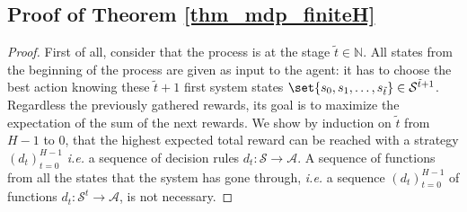 






\subsection{Proof of Theorem \ref{thm_mdp_finiteH}}
\label{thm_mdp_finiteH_RETURN}
\begin{proof}
First of all, consider that the process is at the stage $\tilde{t} \in \mathbb{N}$.
All states from the beginning of the process are given as input to the agent:
it has to choose the best action knowing these $\tilde{t}+1$ first system states 
$\set{ s_0, s_1, \ldots, s_{\tilde{t}} } \in \mathcal{S}^{\tilde{t}+1}$.
Regardless the previously gathered rewards, 
its goal is to maximize the expectation of the sum of the next rewards. 
We show by induction on $\tilde{t}$ from $H-1$ to $0$,
that the highest expected total reward can be reached with a strategy $(d_t)_{t=0}^{H-1}$
\textit{i.e.} a sequence of decision rules $d_t: \mathcal{S} \rightarrow \mathcal{A}$.
A sequence of functions from all the states that the system has gone through,
\textit{i.e.} a sequence $(d_t)_{t=0}^{H-1}$ of functions $d_t: \mathcal{S}^t \rightarrow \mathcal{A}$, 
is not necessary.


\end{proof}
